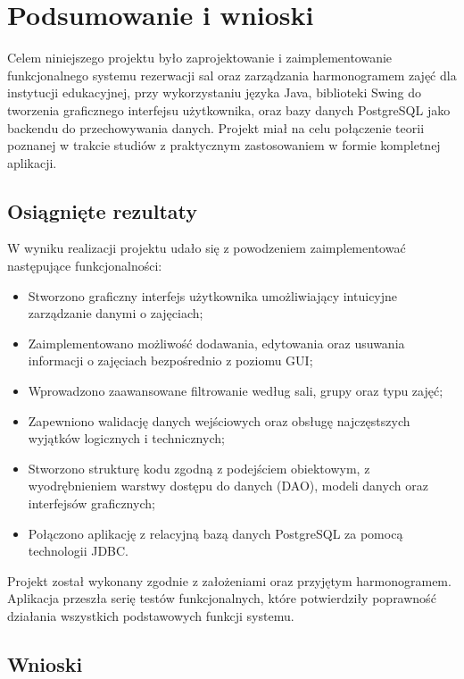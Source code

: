 \chapter{Podsumowanie i wnioski}

Celem niniejszego projektu było zaprojektowanie i zaimplementowanie funkcjonalnego systemu rezerwacji sal oraz zarządzania harmonogramem zajęć dla instytucji edukacyjnej, przy wykorzystaniu języka Java, biblioteki Swing do tworzenia graficznego interfejsu użytkownika, oraz bazy danych PostgreSQL jako backendu do przechowywania danych. Projekt miał na celu połączenie teorii poznanej w trakcie studiów z praktycznym zastosowaniem w formie kompletnej aplikacji.

\section{Osiągnięte rezultaty}

W wyniku realizacji projektu udało się z powodzeniem zaimplementować następujące funkcjonalności:

\begin{itemize}
    \item Stworzono graficzny interfejs użytkownika umożliwiający intuicyjne zarządzanie danymi o zajęciach;
    \item Zaimplementowano możliwość dodawania, edytowania oraz usuwania informacji o zajęciach bezpośrednio z poziomu GUI;
    \item Wprowadzono zaawansowane filtrowanie według sali, grupy oraz typu zajęć;
    \item Zapewniono walidację danych wejściowych oraz obsługę najczęstszych wyjątków logicznych i technicznych;
    \item Stworzono strukturę kodu zgodną z podejściem obiektowym, z wyodrębnieniem warstwy dostępu do danych (DAO), modeli danych oraz interfejsów graficznych;
    \item Połączono aplikację z relacyjną bazą danych PostgreSQL za pomocą technologii JDBC.
\end{itemize}

Projekt został wykonany zgodnie z założeniami oraz przyjętym harmonogramem. Aplikacja przeszła serię testów funkcjonalnych, które potwierdziły poprawność działania wszystkich podstawowych funkcji systemu.

\section{Wnioski}

